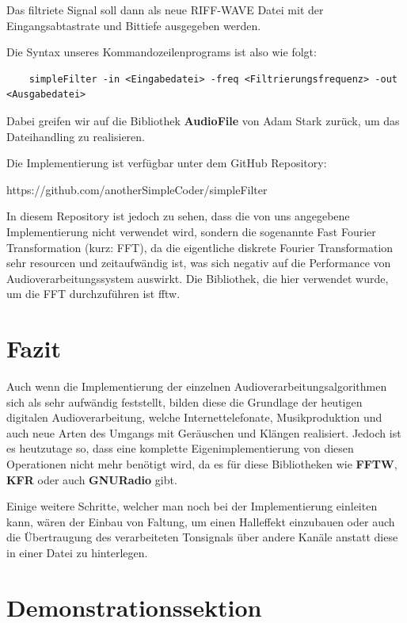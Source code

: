 \documentclass[paper=a4,fontsize=12pt,ngerman]{scrartcl}
\begin{document}
Das filtriete Signal soll dann als neue RIFF-WAVE Datei mit der Eingangsabtastrate und Bittiefe ausgegeben werden.

Die Syntax unseres Kommandozeilenprograms ist also wie folgt:

\begin{lstlisting}
    simpleFilter -in <Eingabedatei> -freq <Filtrierungsfrequenz> -out <Ausgabedatei>
\end{lstlisting}

Dabei greifen wir auf die Bibliothek \textbf{AudioFile} von Adam Stark zurück, um das Dateihandling zu realisieren. 

Die Implementierung ist verfügbar unter dem GitHub Repository:

https://github.com/anotherSimpleCoder/simpleFilter

In diesem Repository ist jedoch zu sehen, dass die von uns angegebene Implementierung nicht verwendet wird, sondern die sogenannte Fast Fourier Transformation (kurz: FFT), da die eigentliche diskrete Fourier Transformation sehr resourcen und zeitaufwändig ist,
was sich negativ auf die Performance von Audioverarbeitungssystem auswirkt. Die Bibliothek, die hier verwendet wurde, um die FFT durchzuführen ist fftw.

\section{Fazit}

Auch wenn die Implementierung der einzelnen Audioverarbeitungsalgorithmen sich als sehr aufwändig feststellt, bilden diese die Grundlage der heutigen digitalen Audioverarbeitung, welche
Internettelefonate, Musikproduktion und auch neue Arten des Umgangs mit Geräuschen und Klängen realisiert. Jedoch ist es heutzutage so, dass eine komplette Eigenimplementierung von diesen Operationen nicht mehr benötigt wird, da
es für diese Bibliotheken wie \textbf{FFTW}, \textbf{KFR} oder auch \textbf{GNURadio} gibt.

Einige weitere Schritte, welcher man noch bei der Implementierung einleiten kann, wären der Einbau von Faltung, um einen Halleffekt einzubauen oder auch die Übertraugung des verarbeiteten Tonsignals über andere Kanäle anstatt diese in einer Datei zu hinterlegen.

\section{Demonstrationssektion}
\end{document}
